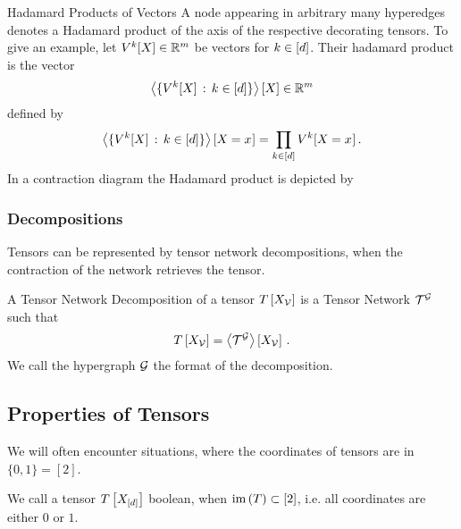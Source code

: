\begin{example}{Hadamard Products of Vectors}
	A node appearing in arbitrary many hyperedges denotes a Hadamard product of the axis of the respective decorating tensors.
	To give an example, let $V^{k}[X]\in\mathbb{R}^m$ be vectors for $k\in[d]$. Their hadamard product is the vector
		\[ \left\langle \{V^{k}[X] \, : \, k\in[d]\}\right\rangle \left[ X \right]  \in \mathbb{R}^m \]
	defined by
		\[ \left\langle \{V^{k}[X] \, : \, k\in[d]\}\right\rangle \left[ X_{}=x_{} \right]   
		= \prod_{k\in[d]} V^{k}[X_{}=x_{}]\, . \]
	In a contraction diagram the Hadamard product is depicted by 
	\begin{center}
		
	\end{center}
\end{example}



\subsubsection{Decompositions}

Tensors can be represented by tensor network decompositions, when the contraction of the network retrieves the tensor.

\begin{definition}\label{def:tnDecomposition}
	A Tensor Network Decomposition of a tensor $T\left[X_{\mathcal{V}}\right]$ is a Tensor Network $\mathcal{T}^{\mathcal{G}}$ such that
		\[ T\left[X_{\mathcal{V}}\right]= \left\langle \mathcal{T}^{\mathcal{G}}\right\rangle \left[ X_{\mathcal{V}} \right] \, . \]
	We call the hypergraph $\mathcal{G}$ the format of the decomposition.
\end{definition}



\subsection{Properties of Tensors}

We will often encounter situations, where the coordinates of tensors are in $\{0,1\}=[2]$.

\begin{definition}\label{def:booleanTensor} %
	We call a tensor $T\left[X_{[d]}\right]$ boolean, when $\mathrm{im}\left(T\right)\subset[2]$, i.e. all coordinates are either $0$ or $1$.
\end{definition}

